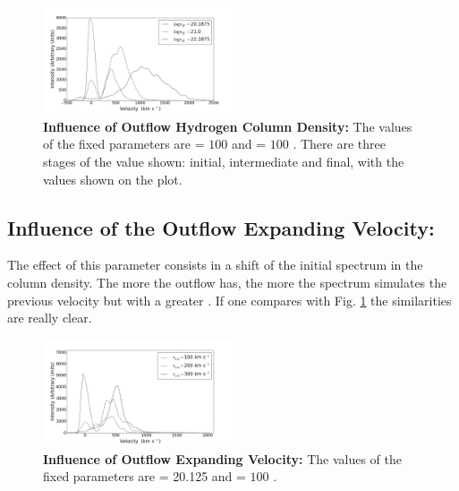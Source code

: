 \documentclass{latex/emulateapj}
\begin{document}
\begin{figure}[h!]
\begin{center}
  \includegraphics[width=0.5\textwidth]{./figures/inf_lognh_soft.png}
\end{center}
\caption{\textbf{Influence of Outflow Hydrogen Column Density:} The values of the fixed parameters are \vout = $100$ \kms and \vrot = $100$ \kms. There are three stages of the \lognh value shown: initial, intermediate and final, with the values shown on the plot.\\
\label{fig:influence_lognH}}
\end{figure}

\subsection{Influence of the Outflow Expanding Velocity: \vout }

The effect of this parameter consists in a shift of the initial spectrum in the column density. The more \vout the outflow has, the more the spectrum simulates the previous velocity but with a greater \lognh. If one compares with Fig. \ref{fig:influence_lognH} the similarities are really clear. \\

\begin{figure}[h!]
\begin{center}
  \includegraphics[width=0.5\textwidth]{./figures/inf_vout1_soft.png}
\end{center}
\caption{\textbf{Influence of Outflow Expanding Velocity:} The values of the fixed parameters are \lognh = 20.125 and \vrot = $100$ \kms.\\
\label{fig:influence_vout1}}
\end{figure}
\end{document}
